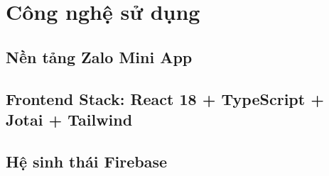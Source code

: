
\chapter{Công nghệ sử dụng}
\label{ch:cong-nghe}


\section{Nền tảng Zalo Mini App}
\label{sec:zalo}

\section{Frontend Stack: React 18 + TypeScript + Jotai + Tailwind}
\label{sec:frontend}

\section{Hệ sinh thái Firebase}
\label{sec:firebase}

